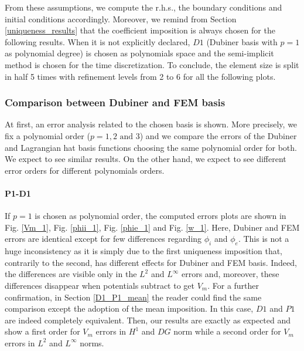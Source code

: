 \documentclass[a4paper,11pt]{article}
\begin{document}
\noindent From these assumptions, we compute the r.h.s., the boundary conditions and initial conditions accordingly. Moreover, we remind from Section \ref{uniqueness_results} that the coefficient imposition is always chosen for the following results. When it is not explicitly declared, $D1$ (Dubiner basis with $p=1$ as polynomial degree) is chosen as polynomials space and the semi-implicit method is chosen for the time discretization. To conclude, the element size is split in half 5 times with refinement levels from 2 to 6 for all the following plots.

\subsubsection{Comparison between Dubiner and FEM basis} \label{Dubiner_FEM_comparison}
At first, an error analysis related to the chosen basis is shown. More precisely, we fix a polynomial order ($p=1,2 \text{ and } 3$) and we compare the errors of the Dubiner and Lagrangian hat basis functions choosing the same polynomial order for both. We expect to see similar results. On the other hand, we expect to see different error orders for different polynomials orders.
\paragraph{P1-D1}
If $p=1$ is chosen as polynomial order, the computed errors plots are shown in Fig. \ref{Vm_1}, Fig. \ref{phii_1}, Fig. \ref{phie_1} and Fig. \ref{w_1}. 
\noindent Here, Dubiner and FEM errors are identical except for few differences regarding $\phi_i$ and $\phi_e$. This is not a huge inconsistency as it is simply due to the first uniqueness imposition that, contrarily to the second, has different effects for Dubiner and FEM basis. Indeed, the differences are visible only in the $L^2$ and $L^\infty$ errors and, moreover, these differences disappear when potentials subtract to get $V_m$. For a further confirmation, in Section \ref{D1_P1_mean} the reader could find the same comparison except the adoption of the mean imposition. In this case, $D1$ and $P1$ are indeed completely equivalent. Then, our results are exactly as expected and show a first order for $V_m$ errors in $H^1$ and $DG$ norm while a second order for $V_m$ errors in $L^2$ and $L^\infty$ norms.
\end{document}
